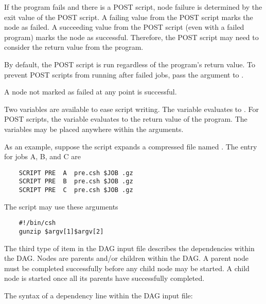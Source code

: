 If the program fails and there is a POST script,
node failure is determined by the exit value of the POST script.
A failing value from the POST script marks the node as failed.
A succeeding value from the POST script (even with a failed
program) marks the node as successful.
Therefore, the POST script may need to consider the return
value from the program.

By default, the POST script is run regardless of the program's
return value.  To prevent POST scripts from running after failed jobs,
pass the  argument to .

A node not marked as failed at any point is successful.

Two variables are available to ease script writing.
The  variable evaluates to .
For POST scripts, the  variable evaluates to the return value of the program.
The variables may be
placed anywhere within the arguments.

As an example, suppose the  script expands a compressed file named
.
The  entry for jobs A, B, and C are

\begin{verbatim}
	SCRIPT PRE  A  pre.csh $JOB .gz
	SCRIPT PRE  B  pre.csh $JOB .gz
	SCRIPT PRE  C  pre.csh $JOB .gz
\end{verbatim}

The script  may use these arguments

\begin{verbatim}
	#!/bin/csh
	gunzip $argv[1]$argv[2]
\end{verbatim}


The third type of item in the DAG input file describes the
dependencies within the DAG.
Nodes are parents and/or children within the DAG.
A parent node must be completed successfully before
any child node may be started.
A child node is started once
all its parents have successfully completed.

The syntax of a dependency line within the DAG input file:

   

